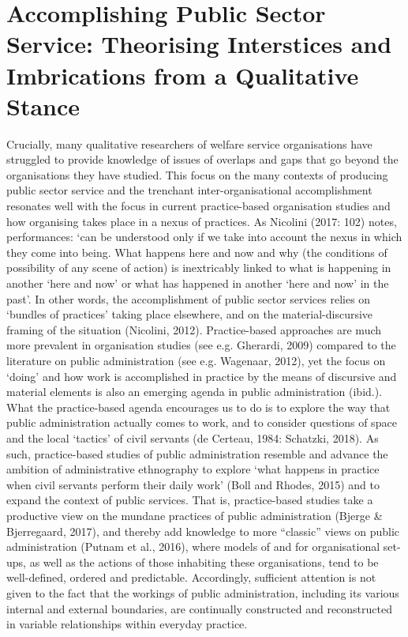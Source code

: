 \chapter{Accomplishing Public Sector Service: Theorising Interstices and Imbrications from a Qualitative Stance}
Crucially, many qualitative researchers of welfare service organisations have struggled to provide knowledge of issues of overlaps and gaps that go beyond the organisations they have studied. This focus on the many contexts of producing public sector service and the trenchant inter-organisational accomplishment resonates well with the focus in current practice-based organisation studies and how organising takes place in a nexus of practices. As Nicolini (2017: 102) notes, performances: ‘can be understood only if we take into account the nexus in which they come into being. What happens here and now and why (the conditions of possibility of any scene of action) is inextricably linked to what is happening in another ‘here and now’ or what has happened in another ‘here and now’ in the past’. In other words, the accomplishment of public sector services relies on ‘bundles of practices’ taking place elsewhere, and on the material-discursive framing of the situation (Nicolini, 2012). Practice-based approaches are much more prevalent in organisation studies (see e.g. Gherardi, 2009) compared to the literature on public administration (see e.g. Wagenaar, 2012), yet the focus on ‘doing’ and how work is accomplished in practice by the means of discursive and material elements is also an emerging agenda in public administration (ibid.). What the practice-based agenda encourages us to do is to explore the way that public administration actually comes to work, and to consider questions of space and the local ‘tactics’ of civil servants (de Certeau, 1984: Schatzki, 2018). As such, practice-based studies of public administration resemble and advance the ambition of administrative ethnography to explore ‘what happens in practice when civil servants perform their daily work’ (Boll and Rhodes, 2015) and to expand the context of public services. That is, practice-based studies take a productive view on the mundane practices of public administration (Bjerge \& Bjerregaard, 2017), and thereby add knowledge to more “classic” views on public administration (Putnam et al., 2016), where models of and for organisational set-ups, as well as the actions of those inhabiting these organisations, tend to be well-defined, ordered and predictable. Accordingly, sufficient attention is not given to the fact that the workings of public administration, including its various internal and external boundaries, are continually constructed and reconstructed in variable relationships within everyday practice.
